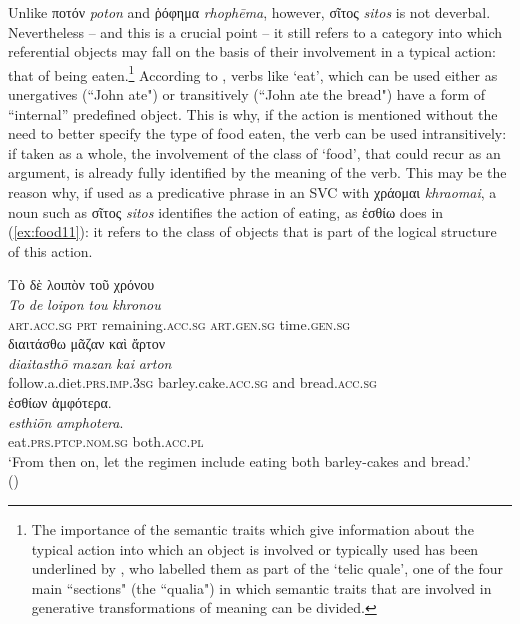 \documentclass[output=paper,colorlinks,citecolor=brown]{langscibook}
\begin{document}
Unlike ποτόν \textit{poton} and ῥόφημα \textit{rhophēma}, however, σῖτος \textit{sitos} is not deverbal. Nevertheless – and this is a crucial point – it still refers to a category into which referential objects may fall on the basis of their involvement in a typical action: that of being eaten.\footnote{The importance of the semantic traits which give information about the typical action into which an object is involved or typically used has been underlined by \citet[76--81]{Pustejovsky1995}, who labelled them as part of the ‘telic quale’, one of the four main “sections" (the “qualia") in which semantic traits that are involved in generative transformations of meaning can be divided.} According to \citet{HaleKeyserES1987,halekeyser1993}, verbs like ‘eat’, which can be used either as unergatives (“John ate") or transitively (“John ate the bread") have a form of “internal” predefined object. This is why, if the action is mentioned without the need to better specify the type of food eaten, the verb can be used intransitively: if taken as a whole, the involvement of the class of ‘food’, that could recur as an argument, is already fully identified by the meaning of the verb. This may be the reason why, if used as a predicative phrase in an SVC with χράομαι \textit{khraomai}, a noun such as σῖτος \textit{sitos} identifies the action of eating, as ἐσθίω does in (\ref{ex:food11}): it refers to the class of objects that is part of the logical structure of this action.

\begin{exe}
\ex\label{ex:food11}
\glll Τὸ δὲ λοιπὸν τοῦ χρόνου  \\ 
\textit{To} \textit{de} \textit{loipon} \textit{tou} \textit{khronou}  \\
\textsc{art.acc.sg} \textsc{prt} remaining.\textsc{acc.sg} \textsc{art.gen.sg} time.\textsc{gen.sg}   \\

\glll διαιτάσθω μᾶζαν καὶ ἄρτον  \\
\textit{diaitasthō} \textit{mazan} \textit{kai} \textit{arton}  \\
follow.a.diet.\textsc{prs.imp.3sg} barley.cake.\textsc{acc.sg} and bread.\textsc{acc.sg}  \\

\glll ἐσθίων ἀμφότερα. \\
\textit{esthiōn} \textit{amphotera}. \\
eat.\textsc{prs.ptcp.nom.sg} both.\textsc{acc.pl} \\
\glt ‘From then on, let the regimen include eating both barley-cakes and bread.' \\
\hspace*{\fill}()
\end{exe}
\end{document}
